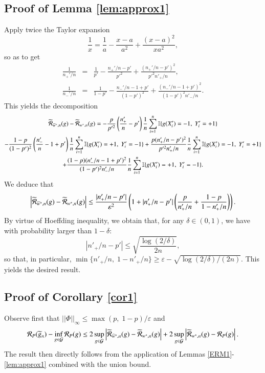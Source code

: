 \documentclass[12pt]{article}
\newcommand{\cR}{{\cal R}}
\begin{document}
\subsection*{Proof of Lemma \ref{lem:approx1}}
Apply twice the Taylor expansion
$$
\frac{1}{x}=\frac{1}{a}-\frac{x-a}{a^2}+\frac{(x-a)^2}{xa^2},
$$
so as to get
\begin{eqnarray*}
\frac{1}{n_+'/n}&=&\frac{1}{p'}-\frac{n_+'/n-p'}{p'^2}+\frac{(n_+'/n-p')^2}{p'^2 n'_+/n},\\
\frac{1}{n_-'/n}&=&\frac{1}{1-p'}-\frac{n_-'/n-1+p'}{(1-p')^2}+\frac{(n_-'/n-1+p')^2}{(1-p')^2n'_-/n}.
\end{eqnarray*}
This yields the decomposition
\begin{multline*}
\widetilde{\cR}_{\widehat{w}^*,n}(g)-\widetilde{\cR}_{w^*,n}(g)=-\frac{p}{p'^2}\left(\frac{n'_+}{n}-p'\right)\frac{1}{n}\sum_{i=1}^n\mathbb{I}\{g(X'_i)=-1,\; Y'_i=+1 \}\\
-\frac{1-p}{(1-p')^2}\left(\frac{n'_-}{n}-1+p'\right)\frac{1}{n}\sum_{i=1}^n\mathbb{I}\{g(X'_i)=+1,\; Y'_i=-1 \}+\frac{p(n_+'/n-p')^2}{p'^2n'_+/n}\frac{1}{n}\sum_{i=1}^n\mathbb{I}\{g(X'_i)=-1,\; Y'_i=+1 \}\\
+\frac{(1-p)(n_-'/n-1+p')^2}{(1-p')^2n'_-/n}\frac{1}{n}\sum_{i=1}^n\mathbb{I}\{g(X'_i)=+1,\; Y'_i=-1 \}.
\end{multline*}
We deduce that
\begin{equation*}
\left\vert
\widetilde{\cR}_{\widehat{w}^*,n}(g)-\widetilde{\cR}_{w^*,n}(g)
\right\vert \leq \frac{\vert n'_+/n-p'\vert}{\varepsilon^2}\left( 1+\vert n'_+/n-p'\vert \left( \frac{p}{n'_+/n}+\frac{1-p}{1-n'_+/n} \right) \right).
\end{equation*}
By virtue of Hoeffding inequality, we obtain that, for any $\delta\in (0,1)$, we have with probability larger than $1-\delta$:
$$
\left\vert n'_+/n-p'\right\vert \leq \sqrt{\frac{\log(2/\delta)}{2n}},
$$
so that, in particular, $\min\{ n'_+/n,\; 1- n'_+/n\}\geq \varepsilon-\sqrt{\log(2/\delta)/(2n)}$. This yields the desired result.

\subsection*{Proof of Corollary \ref{cor1} }
Observe first that $\vert\vert \Phi \vert\vert_{\infty}\leq \max(p,\; 1-p)/\varepsilon$ and
$$
\cR_P(\widetilde{g}_n)-\inf_{g\in\mathcal{G}}\cR_P(g)\leq 2\sup_{g\in \mathcal{G}}\left\vert  \widetilde{\cR}_{\widehat{w}^*,n}(g)-    \widetilde{\cR}_{w^*,n}(g) \right\vert + 2\sup_{g\in \mathcal{G}}\left\vert  \widetilde{\cR}_{w^*,n}(g)-    \cR_{P}(g) \right\vert.
$$
The result then directly follows from the application of Lemmas \ref{ERM1}-\ref{lem:approx1} combined with the union bound.
\end{document}
